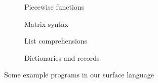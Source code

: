 \begin{figure}
   \begin{subfigure}{0.44\textwidth}
      \tiny
      
      \caption{Piecewise functions}
      \label{fig:core:surface-examples:functions}
   \end{subfigure}
   \begin{subfigure}{0.44\textwidth}
      \tiny
      
      \caption{Matrix syntax}
      \label{fig:core:surface-examples:matrix}
   \end{subfigure}
   \vfill
   \begin{subfigure}{0.44\textwidth}
      \tiny
      
      \caption{List comprehensions}
      \label{fig:core:surface-examples:listcomps}
   \end{subfigure}
   \begin{subfigure}{0.44\textwidth}
      \tiny
      
      \caption{Dictionaries and records}
      \label{fig:core:surface-examples:dicts}
   \end{subfigure}
   \caption{Some example programs in our surface language}
   \label{fig:core:surface-examples}
\end{figure}